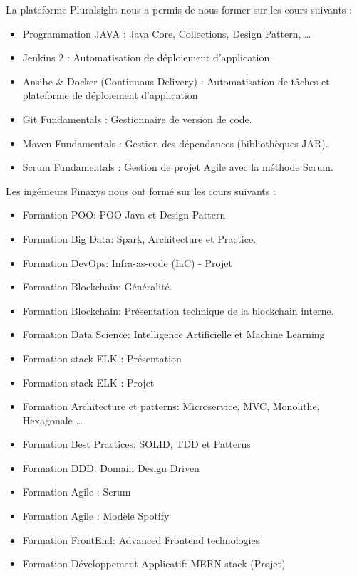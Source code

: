 La plateforme Pluralsight nous a permis de nous former sur les cours suivants :
\begin{itemize}  
    \item Programmation JAVA : Java Core, Collections, Design Pattern, …
    \item Jenkins 2 : Automatisation de déploiement d’application.
    \item Ansibe \& Docker (Continuous Delivery) : Automatisation de tâches et plateforme de déploiement d’application
    \item Git Fundamentals : Gestionnaire de version de code.
    \item Maven Fundamentals : Gestion des dépendances (bibliothèques JAR).
    \item Scrum Fundamentals : Gestion de projet Agile avec la méthode Scrum.
\end{itemize}

Les ingénieurs Finaxys nous ont formé sur les cours suivants :
\begin{itemize}  
    \item Formation POO: POO Java et Design Pattern
    \item Formation Big Data: Spark, Architecture et Practice.
    \item Formation DevOps: Infra-as-code (IaC) - Projet
    \item Formation Blockchain: Généralité.
    \item Formation Blockchain: Présentation technique de la blockchain interne.
    \item Formation Data Science: Intelligence Artificielle et Machine Learning
    \item Formation stack ELK : Présentation
    \item Formation stack ELK : Projet
    \item Formation Architecture et patterns: Microservice, MVC, Monolithe, Hexagonale \dots
    \item Formation Best Practices: SOLID, TDD et Patterns
    \item Formation DDD: Domain Design Driven
    \item Formation Agile : Scrum
    \item Formation Agile : Modèle Spotify
    \item Formation FrontEnd: Advanced Frontend technologies
    \item Formation Développement Applicatif: MERN stack (Projet)
\end{itemize}

